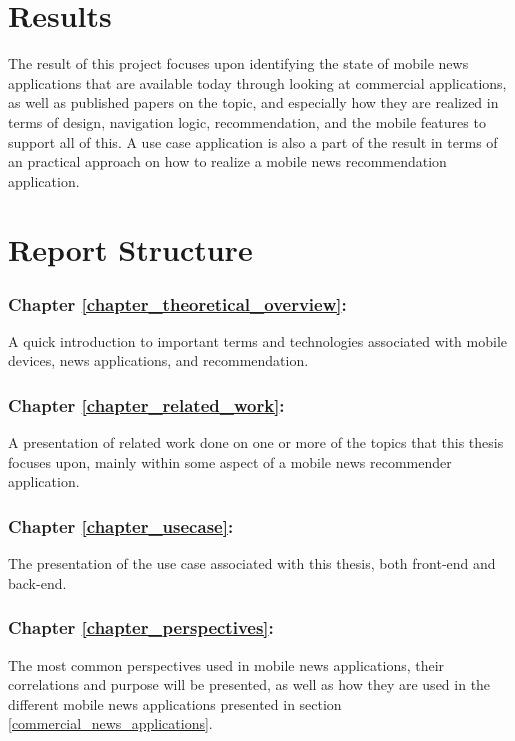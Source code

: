 \section{Results}
The result of this project focuses upon identifying the state of mobile news applications that are available today through looking at commercial applications, as well as published papers on the topic, and especially how they are realized in terms of design, navigation logic, recommendation, and the mobile features to support all of this. A use case application is also a part of the result in terms of an practical approach on how to realize a mobile news recommendation application.

\section{Report Structure}

\subsubsection{Chapter \ref{chapter_theoretical_overview}: }
A quick introduction to important terms and technologies associated with mobile devices, news applications, and recommendation.

\subsubsection{Chapter \ref{chapter_related_work}: }
A presentation of related work done on one or more of the topics that this thesis focuses upon, mainly within some aspect of a mobile news recommender application.


\subsubsection{Chapter \ref{chapter_usecase}: }
The presentation of the use case associated with this thesis, both front-end and back-end.


\subsubsection{Chapter \ref{chapter_perspectives}: }
The most common perspectives used in mobile news applications, their correlations and purpose will be presented, as well as how they are used in the different mobile news applications presented in section \ref{commercial_news_applications}.

